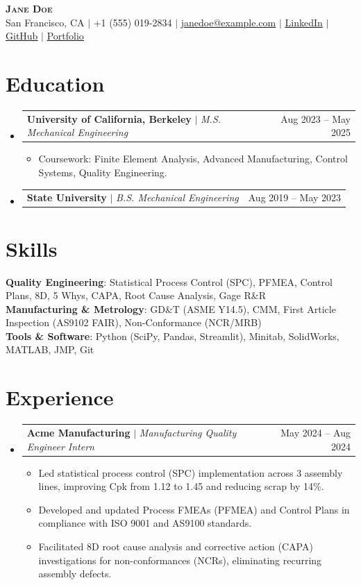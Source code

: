 \documentclass[letterpaper,11pt]{article}
\makeatletter
\newcommand{\resumeItem}[1]{\item\small{#1}}
\newcommand{\resumeEntry}[2]{\item\begin{tabular*}{0.97\textwidth}{l@{\extracolsep{\fill}}r}#1 & #2 \\\end{tabular*}}
\newcommand{\resumeSubHeadingListStart}{\begin{itemize}[leftmargin=0.15in,label={},itemsep=2pt,parsep=0pt,topsep=2pt,partopsep=0pt]}
\newcommand{\resumeSubHeadingListEnd}{\end{itemize}}
\newcommand{\resumeItemListStart}{\begin{itemize}[itemsep=1pt,parsep=0pt,topsep=0pt,partopsep=0pt]}
\newcommand{\resumeItemListEnd}{\end{itemize}}
\makeatother
\begin{document}
\begin{center}
  \textbf{\Huge \scshape Jane Doe}\\ \vspace{1pt}
  \small San Francisco, CA $|$ +1 (555) 019-2834 $|$
  \href{mailto:janedoe@example.com}{\underline{janedoe@example.com}} $|$
  \href{https://linkedin.com/in/janedoe}{\underline{LinkedIn}} $|$
  \href{https://github.com/janedoe}{\underline{GitHub}} $|$
  \href{https://janedoe.github.io}{\underline{Portfolio}}
\end{center}

\section{Education}
\resumeSubHeadingListStart
  \resumeEntry{\textbf{University of California, Berkeley} $|$ \emph{M.S. Mechanical Engineering}}{Aug 2023 -- May 2025}
  \resumeItemListStart
    \resumeItem{Coursework: Finite Element Analysis, Advanced Manufacturing, Control Systems, Quality Engineering.}
  \resumeItemListEnd
  \resumeEntry{\textbf{State University} $|$ \emph{B.S. Mechanical Engineering}}{Aug 2019 -- May 2023}
\resumeSubHeadingListEnd

\section{Skills}
\begin{itemize}[leftmargin=0.15in,label={}]
\small{\item{
  \textbf{Quality Engineering}: Statistical Process Control (SPC), PFMEA, Control Plans, 8D, 5 Whys, CAPA, Root Cause Analysis, Gage R\&R \\
  \textbf{Manufacturing \& Metrology}: GD\&T (ASME Y14.5), CMM, First Article Inspection (AS9102 FAIR), Non-Conformance (NCR/MRB) \\
  \textbf{Tools \& Software}: Python (SciPy, Pandas, Streamlit), Minitab, SolidWorks, MATLAB, JMP, Git
}}
\end{itemize}

\section{Experience}
\resumeSubHeadingListStart
  \resumeEntry{\textbf{Acme Manufacturing} $|$ \emph{Manufacturing Quality Engineer Intern}}{May 2024 -- Aug 2024}
  \resumeItemListStart
    \resumeItem{Led statistical process control (SPC) implementation across 3 assembly lines, improving Cpk from 1.12 to 1.45 and reducing scrap by 14\%.}
    \resumeItem{Developed and updated Process FMEAs (PFMEA) and Control Plans in compliance with ISO 9001 and AS9100 standards.}
    \resumeItem{Facilitated 8D root cause analysis and corrective action (CAPA) investigations for non-conformances (NCRs), eliminating recurring assembly defects.}
  \resumeItemListEnd
\resumeSubHeadingListEnd
\end{document}
